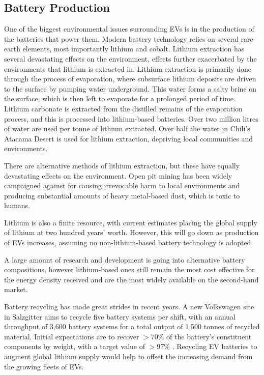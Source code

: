 \documentclass [12pt]{article}
\begin{document}
\subsection{Battery Production}
One of the biggest environmental issues surrounding EVs is in the production of the batteries that power them. Modern battery technology relies on several rare-earth elements, most importantly lithium and cobalt\cite{Lithium_Source}\cite{Earth_Metals}. Lithium extraction has several devastating effects on the environment, effects further exacerbated by the environments that lithium is extracted in\cite{Lithium_Producers}. Lithium extraction is primarily done through the process of evaporation, where subsurface lithium deposits are driven to the surface by pumping water underground\cite{Lithium_Industry}. This water forms a salty brine on the surface, which is then left to evaporate for a prolonged period of time. Lithium carbonate is extracted from the distilled remains of the evaporation process, and this is processed into lithium-based batteries. Over two million litres of water are used per tonne of lithium extracted. Over half the water in Chili’s Atacama Desert is used for lithium extraction, depriving local communities and environments.

There are alternative methods of lithium extraction, but these have equally devastating effects on the environment. Open pit mining has been widely campaigned against for causing irrevocable harm to local environments and producing substantial amounts of heavy metal-based dust, which is toxic to humans\cite{Open_Pit_Mining}.

Lithium is also a finite resource, with current estimates placing the global supply of lithium at two hundred years’ worth. However, this will go down as production of EVs increases, assuming no non-lithium-based battery technology is adopted\cite{Not_Enough_Lithium}.

A large amount of research and development is going into alternative battery compositions, however lithium-based ones still remain the most cost effective for the energy density received and are the most widely available on the second-hand market.

Battery recycling has made great strides in recent years. A new Volkswagen site in Salzgitter aims to recycle five battery systems per shift, with an annual throughput of 3,600 battery systems for a total output of 1,500 tonnes of recycled material\cite{VW_Press_Release}. Initial expectations are to recover \(>\)70\% of the battery's constituent components by weight, with a target value of \(>\)97\% . Recycling EV batteries to augment global lithium supply would help to offset the increasing demand from the growing fleets of EVs.
\end{document}
